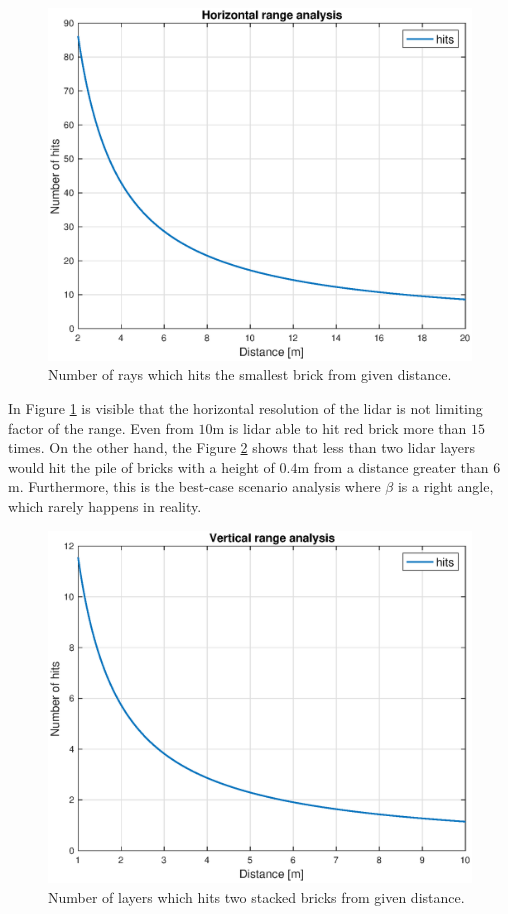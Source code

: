 \begin{figure}[H]
	\centering
	\includegraphics[scale=0.55]{fig/horizontal_range.eps}
	\caption[Horizontal range chart]{Number of rays which hits the smallest brick from given distance.}
	\label{fig:horizontal_hits}
\end{figure}

In Figure \ref{fig:horizontal_hits} is visible that the horizontal resolution of the lidar is not limiting factor of the range. Even from $10$m is lidar able to hit red brick more than $15$ times. On the other hand, the Figure \ref{fig:vertical_hits} shows that less than two lidar layers would hit the pile of bricks with a height of $0.4$m from a distance greater than $6$m. Furthermore, this is the best-case scenario analysis where $\beta$ is a right angle, which rarely happens in reality.

\begin{figure}[H]
	\centering
	\includegraphics[scale=0.55]{fig/vertical_range.eps}
	\caption[Vertical range chart]{Number of layers which hits two stacked bricks from given distance.}
	\label{fig:vertical_hits}
\end{figure}

